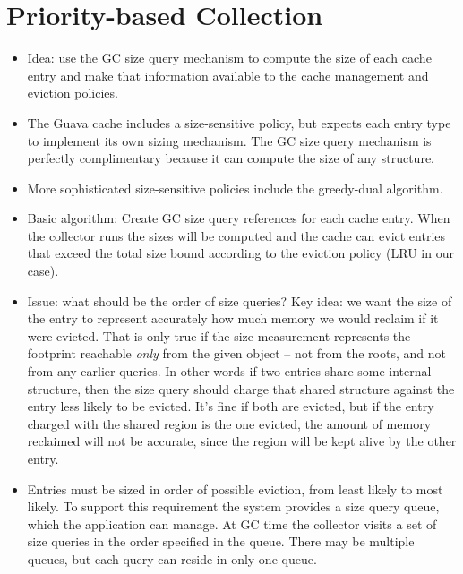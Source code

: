 \section{Priority-based Collection}

\noindent




\begin{itemize}

\item Idea: use the GC size query mechanism to compute the size of each cache
  entry and make that information available to the cache management and eviction
  policies.

\item The Guava cache includes a size-sensitive policy, but expects each entry
  type to implement its own sizing mechanism. The GC size query mechanism is
  perfectly complimentary because it can compute the size of any structure.

\item More sophisticated size-sensitive policies include the greedy-dual
  algorithm.

\item Basic algorithm: Create GC size query references for each cache
  entry. When the collector runs the sizes will be computed and the cache can
  evict entries that exceed the total size bound according to the eviction
  policy (LRU in our case).

\item Issue: what should be the order of size queries? Key idea: we want the
  size of the entry to represent accurately how much memory we would reclaim if
  it were evicted. That is only true if the size measurement represents the
  footprint reachable \emph{only} from the given object -- not from the roots,
  and not from any earlier queries. In other words if two entries share some
  internal structure, then the size query should charge that shared structure
  against the entry less likely to be evicted. It's fine if both are evicted,
  but if the entry charged with the shared region is the one evicted, the amount
  of memory reclaimed will not be accurate, since the region will be kept alive
  by the other entry.

\item Entries must be sized in order of possible eviction, from least likely to
  most likely. To support this requirement the system provides a size query
  queue, which the application can manage. At GC time the collector visits a set
  of size queries in the order specified in the queue. There may be multiple
  queues, but each query can reside in only one queue.


\end{itemize}
